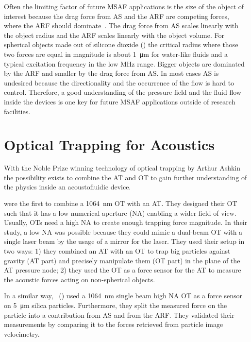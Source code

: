 Often the limiting factor of future MSAF applications is the size of the object 
of interest because the drag force from AS and the ARF are competing forces, 
where the ARF should dominate~\cite{Barnkob2012}. The drag force from AS scales 
linearly with the object radius and the ARF scales linearly with the object 
volume. For spherical objects made out of silicone dioxide (\SiO) the critical 
radius where those two forces are equal in magnitude is about \SI{1}{\um} for 
water-like fluids and a typical excitation frequency in the low 
\si{\mega\hertz} range. Bigger objects are dominated by the ARF and smaller by 
the drag force from AS. In most cases AS is undesired because the 
directionality and the occurrence of the flow is hard to control. Therefore, a 
good understanding of the pressure field and the fluid flow inside the devices 
is one key for future MSAF applications outside of research facilities.

\section{Optical Trapping for Acoustics}

With the Noble Prize winning technology of optical trapping by Arthur 
Ashkin~\cite{Ashkin1978,Ashkin1987,Ashkin2002,Ashkin1986,Ashkin1992,Ashkin1997} 
the possibility exists to combine the AT and OT to gain further understanding 
of the physics inside an acoustofluidic device.

 were the first to combine a \SI{1064}{\nm} OT with an 
AT. They designed their OT such that it has a low numerical aperture (NA) 
enabling a wider field of view. Usually, OTs need a high NA to create enough 
trapping force magnitude. In their study, a low NA was possible because they 
could mimic a dual-beam OT with a single laser beam by the usage of a mirror 
for the laser. They used their setup in two ways: 1) they combined an AT with 
an OT to trap big particles against gravity (AT part) and precisely manipulate 
them (OT part) in the plane of the AT pressure node; 2) they used the OT as a 
force sensor for the AT to measure the acoustic forces acting on non-spherical 
objects.

In a similar way, ~(\citeyear{Bassindale2014}) used a 
\SI{1064}{\nm} single beam high NA OT as a force sensor on \SI{5}{\um} silica 
particles. Furthermore, they split the measured force on the particle into a 
contribution from AS and from the ARF. They validated their measurements by 
comparing it to the forces retrieved from particle image velocimetry.


